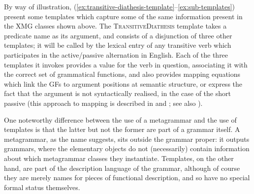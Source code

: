\documentclass[output=paper,hidelinks]{langscibook}
\begin{document}
By way of illustration,
(\ref{ex:transitive-diathesis-template}--\ref{ex:sub-templates}) present some
templates which capture some of the same information present in the XMG classes
shown above. The \textsc{TransitiveDiathesis} template takes a predicate name as
its argument, and consists of a disjunction of three other templates; it will be
called by the lexical entry of any transitive verb which participates in the
active\slash passive alternation in English. Each of the three templates it
invokes provides a \PRED value for the verb in question, associating it with the
correct set of grammatical functions, and also provides mapping equations which
link the GFs to argument positions at semantic structure, or express the fact
that the argument is not syntactically realised, in the case of the short
passive (this approach to mapping is described in \citealt{AsudGior12} and
\citealt{findlay2017mapping}; see also ).


\ea\label{ex:transitive-diathesis-template}%
%
\ex\label{ex:sub-templates}%
\ea%
 \ex%
%
  \ex%
%
\z
%
\z

One noteworthy difference between the use of a metagrammar and the use of
templates is that the latter but not the former are part of a grammar itself. A
metagrammar, as the name suggests, sits outside the grammar proper: it outputs
grammars, where the elementary objects do not (necessarily) contain information
about which metagrammar classes they instantiate. Templates, on the other hand,
are part of the description language of the grammar, although of course they are
merely names for pieces of functional description, and so have no special formal
status themselves.
\end{document}

